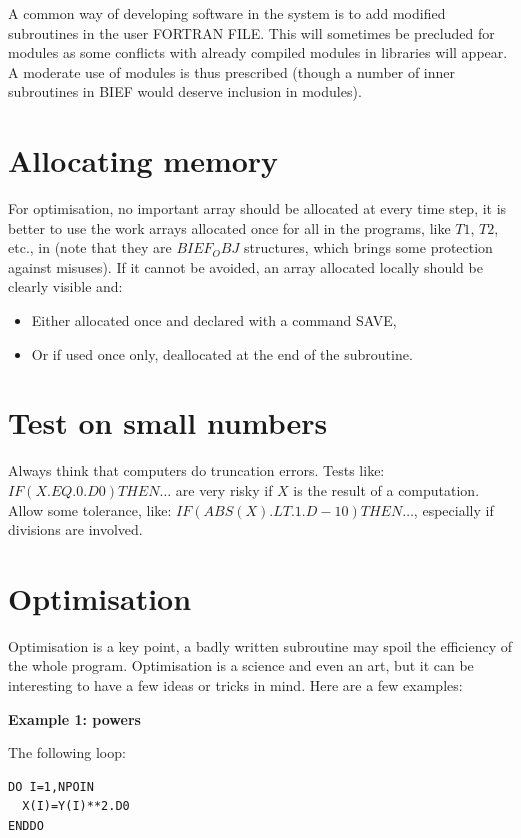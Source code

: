 A common way of developing software in the \telemacsystem system is to add
modified subroutines in the user FORTRAN FILE. This will sometimes be precluded
for modules as some conflicts with already compiled modules in libraries will
appear.\\

A moderate use of modules is thus prescribed (though a number of inner
subroutines in BIEF would deserve inclusion in modules).

\section{Allocating memory}

For optimisation, no important array should be allocated at every time step, it
is better to use the work arrays allocated once for all in the \telemacsystem
programs, like $T1$, $T2$, etc., in  (note that they are $BIEF_OBJ$
structures, which brings some protection against misuses).  If it cannot be
avoided, an array allocated locally should be clearly visible and:
\begin{itemize}
\item Either allocated once and declared with a command SAVE,
\item Or if used once only, deallocated at the end of the subroutine.
\end{itemize}

\section{Test on small numbers}

Always think that computers do truncation errors. Tests like: $IF(X.EQ.0.D0)
THEN…$ are very risky if $X$ is the result of a computation. Allow some
tolerance, like: $IF(ABS(X).LT.1.D-10) THEN…$, especially if divisions are
involved.

\section{Optimisation}

Optimisation is a key point, a badly written subroutine may spoil the
efficiency of the whole program. Optimisation is a science and even an art, but
it can be interesting to have a few ideas or tricks in mind. Here are a few
examples:

\textbf{Example 1: powers}

The following loop:
\begin{lstlisting}
DO I=1,NPOIN
  X(I)=Y(I)**2.D0
ENDDO
\end{lstlisting}

